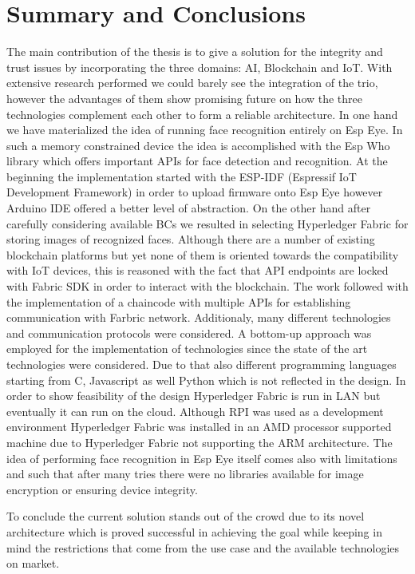 \chapter{Summary and Conclusions}



The main contribution of the thesis is to give a solution for the integrity and trust issues by incorporating the three domains: AI, Blockchain and IoT. With extensive research performed we could barely see the integration of the trio, however the advantages of them show promising future on how the three technologies complement each other to form a reliable architecture. In one hand we have materialized the idea of running face recognition entirely on Esp Eye. In such a memory constrained device the idea is accomplished with the Esp Who library which offers important APIs for face detection and recognition. At the beginning the implementation started with the ESP-IDF (Espressif IoT Development Framework) in order to upload firmware onto Esp Eye however Arduino IDE offered a better level of abstraction. On the other hand after carefully considering available BCs we resulted in selecting Hyperledger Fabric for storing images of recognized faces.
Although there are a number of existing blockchain platforms but yet none of them is oriented towards the compatibility with IoT devices, this is reasoned with the fact that API endpoints are locked with Fabric SDK in order to interact with the blockchain.  The work followed with the implementation of a chaincode with multiple APIs for establishing communication with Farbric network. 
Additionaly, many different technologies and communication protocols were considered. A bottom-up approach was employed for the implementation of technologies since the state of the art technologies were considered. Due to that also different programming languages starting from C, Javascript as well Python which is not reflected in the design. In order to show feasibility of the design Hyperledger Fabric is run in LAN but eventually it can run on the cloud. Although RPI was used as a development environment Hyperledger Fabric was installed in an AMD processor supported machine due to Hyperledger Fabric not supporting the ARM architecture. 
The idea of performing face recognition in Esp Eye itself comes also with limitations and such that after many tries there were no libraries available for image encryption or ensuring device integrity. 

To conclude the current solution stands out of the crowd due to its novel architecture which is proved successful in achieving the goal while keeping in mind the restrictions that come from the use case and the available technologies on market. 


